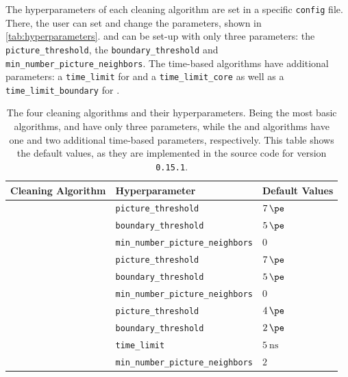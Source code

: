 The hyperparameters of each cleaning algorithm are set in a specific \texttt{config} file. There,
the user can set and change the parameters, shown in \autoref{tab:hyperparameters}. \tailcuts{}
and \mars{} can be set-up with only three parameters: the \texttt{picture\_threshold}, the
\texttt{boundary\_threshold} and \texttt{min\_number\_picture\_neighbors}. The time-based algorithms
have additional parameters: a \texttt{time\_limit} for \fact{} and a \texttt{time\_limit\_core} as
well as a \texttt{time\_limit\_boundary} for \tcc{}.
\begin{table}
    \centering
    \caption{The four cleaning algorithms and their hyperparameters. Being the most basic algorithms,
    \tailcuts{} and \mars{} have only three parameters, while the \fact{} and \tcc{} algorithms have
    one and two additional time-based parameters, respectively. This table shows the default values,
    as they are implemented in the \ctapipe{} source code for version \texttt{0.15.1}.}
    \label{tab:hyperparameters}
    \begin{tabular}{l l l}
        \toprule
        \textbf{Cleaning Algorithm} & \textbf{Hyperparameter} & \textbf{Default Values} \\
        \midrule
        \tailcuts{} & \texttt{picture\_threshold}               & \qquad\(\SI{7}{\pe}\) \\
                    & \texttt{boundary\_threshold}              & \qquad\(\SI{5}{\pe}\) \\
                    & \texttt{min\_number\_picture\_neighbors}  & \qquad\(\num{0}\) \\
        \addlinespace[0.5em]
        \mars{}     & \texttt{picture\_threshold}               & \qquad\(\SI{7}{\pe}\) \\
                    & \texttt{boundary\_threshold}              & \qquad\(\SI{5}{\pe}\) \\
                    & \texttt{min\_number\_picture\_neighbors}  & \qquad\(\num{0}\) \\
        \addlinespace[0.5em]
        \fact{}     & \texttt{picture\_threshold}               & \qquad\(\SI{4}{\pe}\) \\
                    & \texttt{boundary\_threshold}              & \qquad\(\SI{2}{\pe}\) \\
                    & \texttt{time\_limit}                      & \qquad\(\SI{5}{\nano\second}\) \\
                    & \texttt{min\_number\_picture\_neighbors}  & \qquad\(\num{2}\) \\

\end{tabular}
\end{table}
